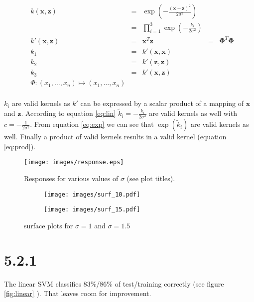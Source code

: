 \documentclass[a4paper,11pt]{article}
\theoremstyle{definition}
\theoremstyle{plain}
\theoremstyle{remark}
\begin{document}
\begin{align}
&k(\boldsymbol{x},\boldsymbol{z})& = &\exp{\left(-\frac{\left(\boldsymbol{x}-\boldsymbol{z}\right)^2}{2\sigma^2}\right)}& \\
&                                & = &\prod_{i=1}^3 \exp{\left(-\frac{k_i}{2\sigma^2}\right)}& \\
&k'(\boldsymbol{x}, \boldsymbol{z})&=& \boldsymbol{x}^T\boldsymbol{z} &=& \boldsymbol{\Phi}^T\boldsymbol{\Phi}\\
&k_1 &=& k'(\boldsymbol{x}, \boldsymbol{x})& \\
&k_2 &=& k'(\boldsymbol{z}, \boldsymbol{z})& \\
&k_3 &=& k'(\boldsymbol{x}, \boldsymbol{z})& \\
&\Phi:  (x_1,\dots,x_n) \mapsto (x_1,\dots,x_n)& \\
\end{align}

$k_i$ are valid kernels as $k'$ can be expressed by a scalar product of a mapping of $\boldsymbol{x}$ and $\boldsymbol{z}$. According to equation \ref{eq:lin} $\tilde k_i = -\frac{k_i}{2\sigma^2}$ are valid kernels as well with $c=-\frac{1}{2\sigma^2}$. From equation \ref{eq:exp} we can see that $\exp\left(\tilde k_i\right)$ are valid kernels as well. Finally a product of valid kernels results in a valid kernel (equation \ref{eq:prod}).

\clearpage

\vspace{50pt}
\begin{figure}[H]
\centering
\texttt{[image: images/response.eps]}
\caption{Responses for various values of $\sigma$ (see plot titles).}
\label{fig:response}
\end{figure}

\begin{figure}[H]
\centering
\begin{subfigure}{0.49\textwidth}
\centering
\texttt{[image: images/surf\_10.pdf]}
\end{subfigure}
\hfill
\begin{subfigure}{0.49\textwidth}
\centering
\texttt{[image: images/surf\_15.pdf]}
\end{subfigure}
\caption{surface plots for $\sigma=1$ and $\sigma=1.5$}
\label{fig:surf}
\end{figure}

\section*{5.2.1}
The linear SVM classifies 83\%/86\% of test/training correctly (see figure \ref{fig:linear} ). That leaves room for improvement.
\end{document}
